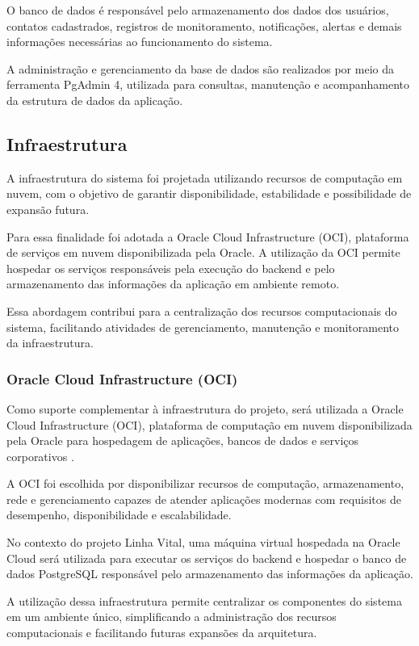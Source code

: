 O banco de dados é responsável pelo armazenamento dos dados dos usuários, contatos cadastrados, registros de monitoramento, notificações, alertas e demais informações necessárias ao funcionamento do sistema.

A administração e gerenciamento da base de dados são realizados por meio da ferramenta PgAdmin 4, utilizada para consultas, manutenção e acompanhamento da estrutura de dados da aplicação.

\subsection{Infraestrutura}

A infraestrutura do sistema foi projetada utilizando recursos de computação em nuvem, com o objetivo de garantir disponibilidade, estabilidade e possibilidade de expansão futura.

Para essa finalidade foi adotada a Oracle Cloud Infrastructure (OCI), plataforma de serviços em nuvem disponibilizada pela Oracle. A utilização da OCI permite hospedar os serviços responsáveis pela execução do backend e pelo armazenamento das informações da aplicação em ambiente remoto.

Essa abordagem contribui para a centralização dos recursos computacionais do sistema, facilitando atividades de gerenciamento, manutenção e monitoramento da infraestrutura.

\subsubsection{Oracle Cloud Infrastructure (OCI)}

Como suporte complementar à infraestrutura do projeto, será utilizada a Oracle Cloud Infrastructure (OCI), plataforma de computação em nuvem disponibilizada pela Oracle para hospedagem de aplicações, bancos de dados e serviços corporativos \cite{oracleoci2026}.

A OCI foi escolhida por disponibilizar recursos de computação, armazenamento, rede e gerenciamento capazes de atender aplicações modernas com requisitos de desempenho, disponibilidade e escalabilidade.

No contexto do projeto Linha Vital, uma máquina virtual hospedada na Oracle Cloud será utilizada para executar os serviços do backend e hospedar o banco de dados PostgreSQL responsável pelo armazenamento das informações da aplicação.

A utilização dessa infraestrutura permite centralizar os componentes do sistema em um ambiente único, simplificando a administração dos recursos computacionais e facilitando futuras expansões da arquitetura.

